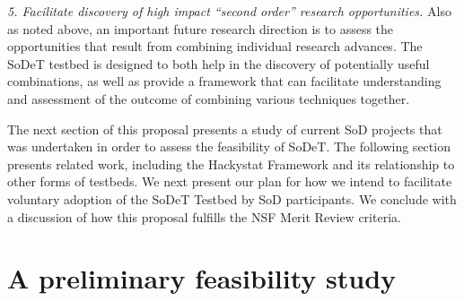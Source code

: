 {\em 5. Facilitate discovery of high impact ``second order'' research 
opportunities.}  Also as noted above, an important future research direction
is to assess the opportunities that result from combining individual 
research advances.  The SoDeT testbed is designed to  both help in the 
discovery of potentially useful combinations, as well as provide a framework
that can facilitate understanding and assessment of the outcome of combining
various techniques together. 

The next section of this proposal presents a study of current SoD projects
that was undertaken in order to assess the feasibility of SoDeT.  The
following section presents related work, including the Hackystat Framework
and its relationship to other forms of testbeds.  We next present our plan
for how we intend to facilitate voluntary adoption of the SoDeT Testbed by
SoD participants. We conclude with a discussion of how this proposal
fulfills the NSF Merit Review criteria.

\section{A preliminary feasibility study}
\label{sec:preliminary-study}

